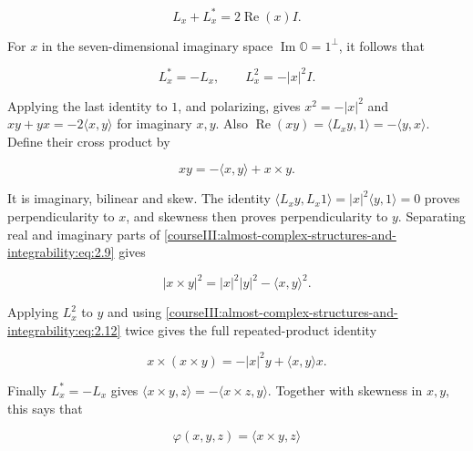 \begin{equation}
L_x+L_x^*=2\operatorname{Re}(x)I.
\label{courseIII:almost-complex-structures-and-integrability:eq:2.10}
\end{equation}

For \(x\) in the seven-dimensional imaginary space \(\operatorname{Im}\mathbb O=1^\perp\), it follows that

\begin{equation}
L_x^*=-L_x,\qquad L_x^2=-|x|^2I.
\label{courseIII:almost-complex-structures-and-integrability:eq:2.11}
\end{equation}

Applying the last identity to \(1\), and polarizing, gives \(x^2=-|x|^2\) and \(xy+yx=-2\langle x,y\rangle\) for imaginary \(x,y\). Also \(\operatorname{Re}(xy)=\langle L_xy,1\rangle=-\langle y,x\rangle\). Define their cross product by

\begin{equation}
xy=-\langle x,y\rangle+x\times y.
\label{courseIII:almost-complex-structures-and-integrability:eq:2.12}
\end{equation}

It is imaginary, bilinear and skew. The identity
\(\langle L_xy,L_x1\rangle=|x|^2\langle y,1\rangle=0\)
proves perpendicularity to \(x\), and skewness then proves perpendicularity to \(y\). Separating real and imaginary parts of \eqref{courseIII:almost-complex-structures-and-integrability:eq:2.9} gives

\begin{equation}
|x\times y|^2=|x|^2|y|^2-\langle x,y\rangle^2.
\label{courseIII:almost-complex-structures-and-integrability:eq:2.13}
\end{equation}

Applying \(L_x^2\) to \(y\) and using \eqref{courseIII:almost-complex-structures-and-integrability:eq:2.12} twice gives the full repeated-product identity

\begin{equation}
x\times(x\times y)=-|x|^2y+\langle x,y\rangle x.
\label{courseIII:almost-complex-structures-and-integrability:eq:2.14}
\end{equation}

Finally \(L_x^*=-L_x\) gives
\(\langle x\times y,z\rangle=-\langle x\times z,y\rangle\).
Together with skewness in \(x,y\), this says that

\begin{equation}
\varphi(x,y,z)=\langle x\times y,z\rangle
\label{courseIII:almost-complex-structures-and-integrability:eq:2.15}
\end{equation}

